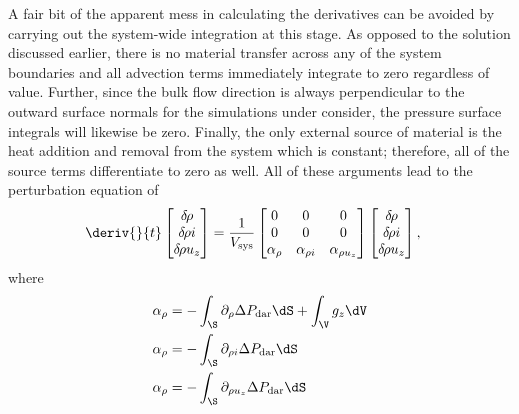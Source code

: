 A fair bit of the apparent mess in calculating the derivatives can be avoided by carrying out the system-wide integration at this stage.
As opposed to the  solution discussed earlier, there is no material transfer across any of the system boundaries and all advection terms immediately integrate to zero regardless of value.
Further, since the bulk flow direction is always perpendicular to the outward surface normals for the simulations under consider, the pressure surface integrals will likewise be zero.
Finally, the only external source of material is the heat addition and removal from the system which is constant; therefore, all of the source terms differentiate to zero as well.
All of these arguments lead to the perturbation equation of 
    \begin{align}
        \deriv{}{t}
        \begin{bmatrix}
            \delta\mkern-2mu\rho \\ \delta\mkern-2mu\rho i \\ \delta\mkern-2mu\rho u_z 
        \end{bmatrix}
         &= 
        \frac{1}{V_{\text{sys}}}
        \begin{bmatrix}
            0 & 0 & 0 \\
            0 & 0 & 0 \\
            \alpha_\rho & \alpha_{\rho i} & \alpha_{\rho u_z} 
        \end{bmatrix}
        \begin{bmatrix}
            \delta\mkern-2mu\rho \\ \delta\mkern-2mu\rho i \\ \delta\mkern-2mu\rho u_z 
        \end{bmatrix},
    \end{align}
    where
    \begin{align*}
        \alpha_\rho &= -\int_{\S}\partial_{\rho}\Delta{P}_{\text{dar}}\dS + \int_{\V}g_z\dV \\
        \alpha_\rho &= -\int_{\S}\partial_{\rho i}\Delta{P}_{\text{dar}}\dS \\
        \alpha_\rho &= -\int_{\S}\partial_{\rho u_z}\Delta{P}_{\text{dar}}\dS 
    \end{align*}
   
